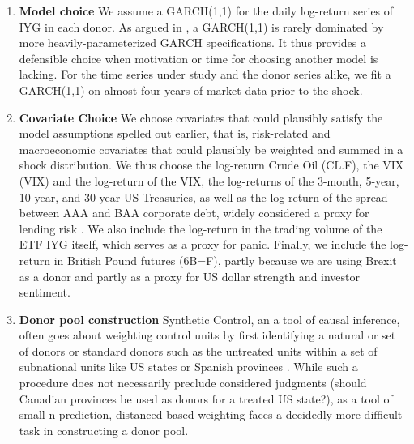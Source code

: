 \documentclass[11pt]{article}
\theoremstyle{definition}
\begin{document}
\begin{enumerate}
    \item \textbf{Model choice} We assume a GARCH(1,1) for the daily log-return series of IYG in each donor.  As argued in \citet{hansen2005forecast}, a GARCH(1,1) is rarely dominated by more heavily-parameterized GARCH specifications.  It thus provides a defensible choice when motivation or time for choosing another model is lacking.  For the time series under study and the donor series alike, we fit a GARCH(1,1) on almost four years of market data prior to the shock.

    \item \textbf{Covariate Choice} We choose covariates that could plausibly satisfy the model assumptions spelled out earlier, that is, risk-related and macroeconomic covariates that could plausibly be weighted and summed in a shock distribution.  We thus choose the log-return Crude Oil (CL.F), the VIX (VIX) and the log-return of the VIX, the log-returns of the 3-month, 5-year, 10-year, and 30-year US Treasuries, as well as the log-return of the spread between AAA and BAA corporate debt, widely considered a proxy for lending risk \citep{goodell2013us, kane1996p}.  We also include the log-return in the trading volume of the ETF IYG itself, which serves as a proxy for panic.  Finally, we include the log-return in British Pound futures (6B=F), partly because we are using Brexit as a donor and partly as a proxy for US dollar strength and investor sentiment.

    \item \textbf{Donor pool construction} Synthetic Control, an a tool of causal inference, often goes about weighting control units by first identifying a natural or set of donors or standard donors such as the untreated units within a set of subnational units like US states or Spanish provinces \citep{abadie2003economic, abadie2010synthetic}.  While such a procedure does not necessarily preclude considered judgments (should Canadian provinces be used as donors for a treated US state?), as a tool of small-n prediction, distanced-based weighting faces a decidedly more difficult task in constructing a donor pool.  
    

\end{enumerate}
\end{document}
